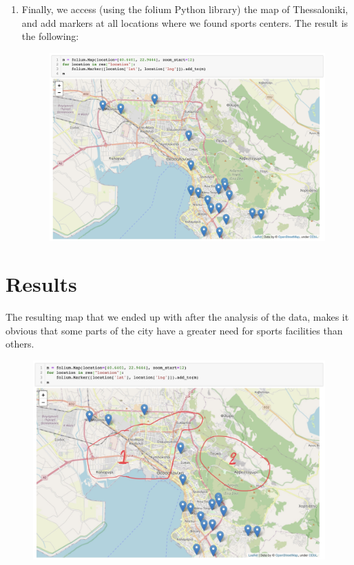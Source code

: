 \documentclass[11pt]{article}
\begin{document}
\begin{enumerate}
\item Finally, we access (using the folium Python library) the map of Thessaloniki, and add markers at all locations where we found sports centers. The result is the following: 
\begin{figure}[htbp]
\centerline{\includegraphics[scale=0.3]{map.png}}
\end{figure}

\end{enumerate}

\section{Results}
The resulting map that we ended up with after the analysis of the data, makes it obvious that some parts of the city have a greater need for sports facilities than others.

\begin{figure}[htbp]
\centerline{\includegraphics[scale=0.2]{map.JPG}}
\end{figure}
\end{document}
